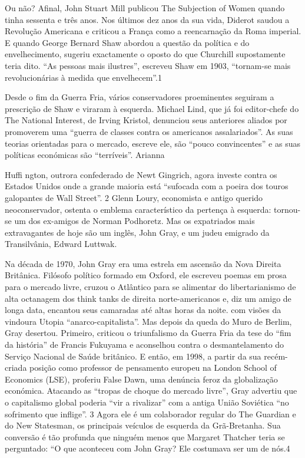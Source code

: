  \par 
Ou não? Afinal, John Stuart Mill publicou The Subjection of Women quando tinha sessenta e três anos. Nos últimos dez anos da sua vida, Diderot saudou a Revolução Americana e criticou a França como a reencarnação da Roma imperial. E quando George Bernard Shaw abordou a questão da política e do envelhecimento, sugeriu exactamente o oposto do que Churchill supostamente teria dito. “As pessoas mais ilustres”, escreveu Shaw em 1903, “tornam-se mais revolucionárias à medida que envelhecem”.{\color{blue}1}
 \par 
Desde o fim da Guerra Fria, vários conservadores proeminentes seguiram a prescrição de Shaw e viraram à esquerda. Michael Lind, que já foi editor-chefe do The National Interest, de Irving Kristol, denunciou seus anteriores aliados por promoverem uma “guerra de classes contra os americanos assalariados”. As suas teorias orientadas para o mercado, escreve ele, são “pouco convincentes” e as suas políticas económicas são “terríveis”. Arianna
 \par 
Huffi ngton, outrora confederado de Newt Gingrich, agora investe contra os Estados Unidos onde a grande maioria está “sufocada com a poeira dos touros galopantes de Wall Street”. {\color{blue}2} Glenn Loury, economista e antigo querido neoconservador, ostenta o emblema característico da pertença à esquerda: tornou-se um dos ex-amigos de Norman Podhoretz. Mas os expatriados mais extravagantes de hoje são um inglês, John Gray, e um judeu emigrado da Transilvânia, Edward Luttwak.
 \par 
Na década de 1970, John Gray era uma estrela em ascensão da Nova Direita Britânica. Filósofo político formado em Oxford, ele escreveu poemas em prosa para o mercado livre, cruzou o Atlântico para se alimentar do libertarianismo de alta octanagem dos think tanks de direita norte-americanos e, diz um amigo de longa data, encantou seus camaradas até altas horas da noite. com visões da vindoura Utopia “anarco-capitalista”. Mas depois da queda do Muro de Berlim, Gray desertou. Primeiro, criticou o triunfalismo da Guerra Fria da tese do “fim da história” de Francis Fukuyama e aconselhou contra o desmantelamento do Serviço Nacional de Saúde britânico. E então, em 1998, a partir da sua recém-criada posição como professor de pensamento europeu na London School of Economics (LSE), proferiu False Dawn, uma denúncia feroz da globalização económica. Atacando as “tropas de choque do mercado livre”, Gray advertiu que o capitalismo global poderia “vir a rivalizar” com a antiga União Soviética “no sofrimento que inflige”. {\color{blue}3} Agora ele é um colaborador regular do The Guardian e do New Statesman, os principais veículos de esquerda da Grã-Bretanha. Sua conversão é tão profunda que ninguém menos que Margaret Thatcher teria se perguntado: “O que aconteceu com John Gray? Ele costumava ser um de nós.{\color{blue}4}
